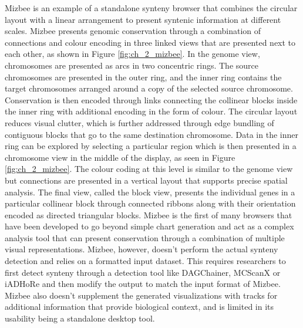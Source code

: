 Mizbee is an example of a standalone synteny browser that combines the circular layout with a linear arrangement to present syntenic information at different scales. Mizbee presents genomic conservation through a combination of connections and colour encoding in three linked views that are presented next to each other, as shown in Figure \ref{fig:ch_2_mizbee}. In the genome view, chromosomes are presented as arcs in two concentric rings. The source chromosomes are presented in the outer ring, and the inner ring contains the target chromosomes arranged around a copy of the selected source chromosome. Conservation is then encoded through links connecting the collinear blocks inside the inner ring with additional encoding in the form of colour. The circular layout reduces visual clutter, which is further addressed through edge bundling of contiguous blocks\cite{zhou2013edge} that go to the same destination chromosome. Data in the inner ring can be explored by selecting a particular region which is then presented in a chromosome view in the middle of the display, as seen in Figure \ref{fig:ch_2_mizbee}. The colour coding at this level is similar to the genome view but connections are presented in a vertical layout that supports precise spatial analysis. The final view, called the block view, presents the individual genes in a particular collinear block through connected ribbons along with their orientation encoded as directed triangular blocks. Mizbee is the first of many browsers that have been developed to go beyond simple chart generation and act as a complex analysis tool that can present conservation through a combination of multiple visual representations. Mizbee, however, doesn't perform the actual synteny detection and relies on a formatted input dataset. This requires researchers to first detect synteny through a detection tool like DAGChainer, MCScanX or iADHoRe and then modify the output to match the input format of Mizbee. Mizbee also doesn't supplement the generated visualizations with tracks for additional information that provide biological context, and is limited in its usability being a standalone desktop tool. 

